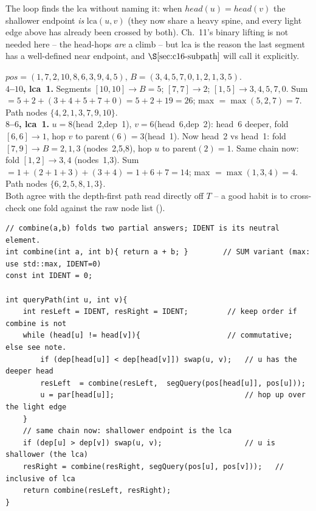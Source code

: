 \begin{observation}
The loop finds the \(\mathrm{lca}\) without naming it: when \(\mathit{head}(u)=\mathit{head}(v)\) the shallower endpoint \emph{is} \(\mathrm{lca}(u,v)\) (they now share a heavy spine, and every light edge above has already been crossed by both).  Ch.~11's binary lifting is not needed here -- the head-hops \emph{are} a climb -- but \(\mathrm{lca}\) is the reason the last segment has a well-defined near endpoint, and \(\secref{c16-subpath}\) will call it explicitly.
\end{observation}

\begin{tracebox}
\(\mathit{pos}=(1,7,2,10,8,6,3,9,4,5)\), \(B=(3,4,5,7,0,1,2,1,3,5)\).\\
\textbf{\(4\)--\(10\), lca~1.} Segments \([10,10]\!\to\!B{=}5\); \([7,7]\!\to\!2\); \([1,5]\!\to\!3,4,5,7,0\). Sum \(=5+2+(3{+}4{+}5{+}7{+}0)=5+2+19=26\); max \(=\max(5,2,7)=7\). Path nodes \(\{4,2,1,3,7,9,10\}\).\\
\textbf{\(8\)--\(6\), lca~1.} \(u{=}8\)(head~2,dep~1), \(v{=}6\)(head~6,dep~2): head~6 deeper, fold \([6,6]\!\to\!1\), hop \(v\) to parent\((6)=3\)(head~1). Now head~2 vs head~1: fold \([7,9]\!\to\!B{=}2,1,3\) (nodes~2,5,8), hop \(u\) to parent\((2)=1\). Same chain now: fold \([1,2]\!\to\!3,4\) (nodes~1,3). Sum \(=1+(2{+}1{+}3)+(3{+}4)=1+6+7=14\); max \(=\max(1,3,4)=4\). Path nodes \(\{6,2,5,8,1,3\}\).\\
Both agree with the depth-first path read directly off \(T\) -- a good habit is to cross-check one fold against the raw node list ().
\end{tracebox}

\begin{lstlisting}[caption={Generic heavy-light path query: fold the deeper head's range, hop to parent(head), finish with one same-chain segment. combine/IDENT parameterise sum, max, count.}, label={lst:c16-pathquery}]
// combine(a,b) folds two partial answers; IDENT is its neutral element.
int combine(int a, int b){ return a + b; }        // SUM variant (max: use std::max, IDENT=0)
const int IDENT = 0;

int queryPath(int u, int v){
    int resLeft = IDENT, resRight = IDENT;         // keep order if combine is not
    while (head[u] != head[v]){                    // commutative; else see note.
        if (dep[head[u]] < dep[head[v]]) swap(u, v);   // u has the deeper head
        resLeft  = combine(resLeft,  segQuery(pos[head[u]], pos[u]));
        u = par[head[u]];                              // hop up over the light edge
    }
    // same chain now: shallower endpoint is the lca
    if (dep[u] > dep[v]) swap(u, v);                   // u is shallower (the lca)
    resRight = combine(resRight, segQuery(pos[u], pos[v]));   // inclusive of lca
    return combine(resLeft, resRight);
}
\end{lstlisting}

